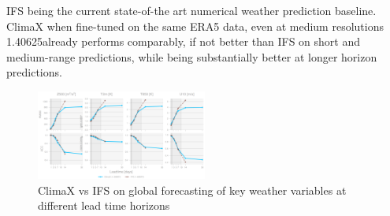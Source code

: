 \documentclass[../paper.tex]{subfiles}
\begin{document}
            IFS being the current state-of-the art numerical weather prediction baseline.\\
            ClimaX when fine-tuned on the same ERA5 data,
            even at medium resolutions 1.40625\textdegree already performs comparably,
            if not better than IFS on short and medium-range predictions,
            while being substantially better at longer horizon predictions\cite{d1}.
            \begin{figure}[htbp]
            \centerline{\includegraphics[width=0.5\textwidth]{../photos/climax_ifs}}
            \caption{ClimaX vs IFS on global forecasting of key weather variables at different lead time horizons}
            \label{fig:climax-vs-ifs}
            \end{figure}
\end{document}

